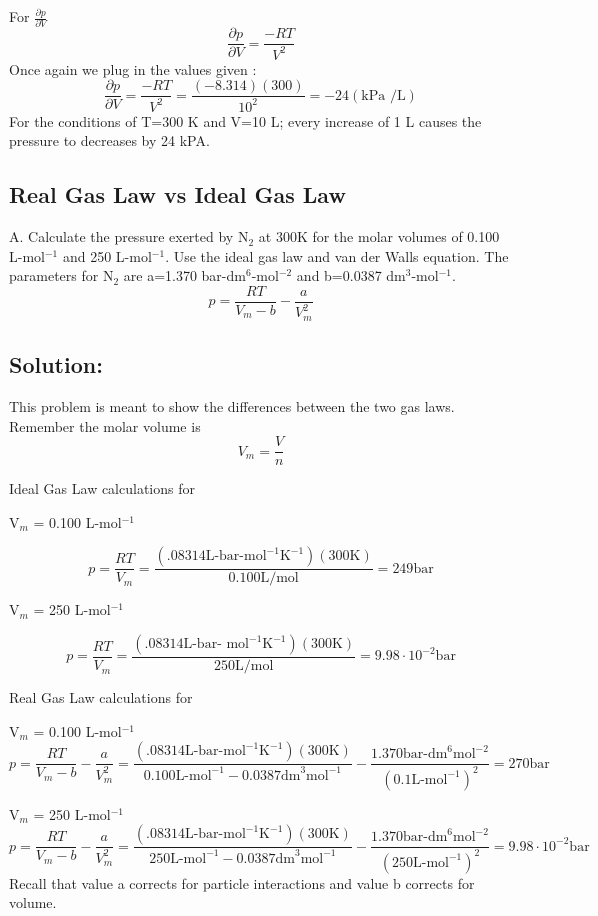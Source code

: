\documentclass{article}
\newcommand{\be}{\begin{equation}}
\newcommand{\ee}{\end{equation}}
\newcommand{\pd}{\partial}
\begin{document}
For $\frac{\pd p}{\pd V}$
\be
\frac{\pd p}{\pd V} = \frac{-RT}{V^2}
\ee
Once again we plug in the values given : 
\be
\frac{\pd p}{\pd V} = \frac{-RT}{V^2} = \frac{(-8.314)(300)}{10^2} = -24 (\text{kPa /L})
\ee
For the conditions of T=300 K and V=10 L; every increase of 1 L causes the pressure to decreases by 24 kPA. 

\subsection{Real Gas Law vs Ideal Gas Law}
A. Calculate the pressure exerted by N$_2$ at 300K for the molar volumes of 0.100 L-mol$^{-1}$ and 250 L-mol$^{-1}$. 
Use the  ideal gas law and van der Walls equation. 
The parameters for N$_2$ are a=1.370 bar-dm$^6$-mol$^{-2}$ and b=0.0387 dm$^3$-mol$^{-1}$.
\be
p=\frac{RT}{V_m - b}-\frac{a}{V^2_m}
\ee

\subsection*{Solution:}
This problem is meant to show the differences between the two gas laws.
Remember the molar volume is 
\be
V_m = \frac{V}{n}
\ee

Ideal Gas Law calculations for 

V$_m$ = 0.100 L-mol$^{-1}$ 

\be
p = \frac{RT}{V_m} = \frac{(.08314 \text{L-bar-mol}^{-1}\text{K}^{-1})(300 \text{K})}{0.100 \text{L/mol}} = 249 \text{bar}
\ee

V$_m$ = 250 L-mol$^{-1}$ 

\be
p = \frac{RT}{V_m} = \frac{(.08314\text{L-bar- mol}^{-1}\text{K}^{-1})(300\text{K})}{250\text{L/mol}} = 9.98 \cdot 10^{-2} \text{bar}
\ee

Real Gas Law calculations for 

V$_m$ = 0.100 L-mol$^{-1}$ 
\be
p=\frac{RT}{V_m - b}-\frac{a}{V^2_m} = \frac{(.08314\text{L-bar-mol}^{-1}\text{K}^{-1})(300\text{K})}{0.100\text{L-mol}^{-1} - 0.0387\text{dm}^3\text{mol}^{-1}} - \frac{1.370\text{bar-dm}^6\text{mol}^{-2}}{(0.1\text{L-mol}^{-1})^2} = 270 \text{bar}
\ee

V$_m$ = 250 L-mol$^{-1}$ 
\be
p=\frac{RT}{V_m - b}-\frac{a}{V^2_m} = \frac{(.08314\text{L-bar-mol}^{-1}\text{K}^{-1})(300\text{K})}{250\text{L-mol}^{-1} - 0.0387\text{dm}^3\text{mol}^{-1}} - \frac{1.370\text{bar-dm}^6\text{mol}^{-2}}{(250\text{L-mol}^{-1})^2} = 9.98 \cdot 10^{-2} \text{bar}
\ee
Recall that value a corrects for particle interactions and value b corrects for volume. 
\end{document}
